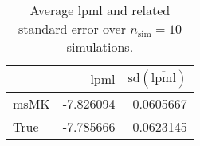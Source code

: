 \begin{table}[H]

\caption{Average lpml and related standard error over $n_{\text{sim}} = 10$ simulations.}
\centering
\begin{tabular}[t]{lrr}
\toprule
  & $\overbar{\text{lpml}}$ & $\text{sd}(\overbar{\text{lpml}})$\\
\midrule
msMK & -7.826094 & 0.0605667\\
True & -7.785666 & 0.0623145\\
\bottomrule
\end{tabular}
\end{table}